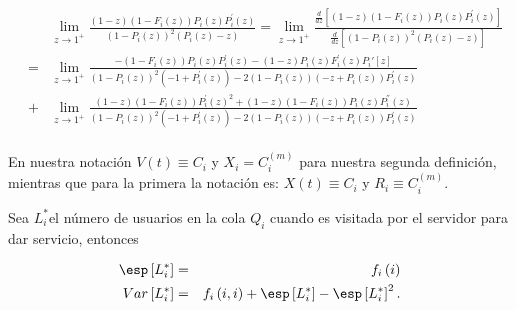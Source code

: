 \begin{eqnarray*}
&&\lim_{z\rightarrow1^{+}}\frac{\left(1-z\right)\left(1-F_{i}\left(z\right)\right)P_{i}\left(z\right)P_{i}^{'}\left(z\right)}{\left(1-P_{i}\left(z\right)\right)^{2}\left(P_{i}\left(z\right)-z\right)}=\lim_{z\rightarrow1^{+}}\frac{\frac{d}{dz}\left[\left(1-z\right)\left(1-F_{i}\left(z\right)\right)P_{i}\left(z\right)P_{i}^{'}\left(z\right)\right]}{\frac{d}{dz}\left[\left(1-P_{i}\left(z\right)\right)^{2}\left(P_{i}\left(z\right)-z\right)\right]}\\
&=&\lim_{z\rightarrow1^{+}}\frac{-\left(1-F_{i}\left(z\right)\right) P_{i}\left(z\right) P_{i}^{'}\left(z\right)-(1-z) P_{i}\left(z\right) F_{i}^{'}\left(z\right)P_i'[z]}{\left(1-P_{i}\left(z\right)\right)^2 \left(-1+P_{i}^{'}\left(z\right)\right)-2 \left(1-P_{i}\left(z\right)\right) \left(-z+P_{i}\left(z\right)\right) P_{i}^{'}\left(z\right)}\\
&+&\lim_{z\rightarrow1^{+}}\frac{(1-z) \left(1-F_{i}\left(z\right)\right) P_{i}^{'}\left(z\right)^2+(1-z) \left(1-F_{i}\left(z\right)\right) P_{i}\left(z\right) P_{i}^{''}\left(z\right)}{\left(1-P_{i}\left(z\right)\right)^2 \left(-1+P_{i}^{'}\left(z\right)\right)-2 \left(1-P_{i}\left(z\right)\right) \left(-z+P_{i}\left(z\right)\right) P_{i}^{'}\left(z\right)}\\
\end{eqnarray*}



En nuestra notaci\'on $V\left(t\right)\equiv C_{i}$ y $X_{i}=C_{i}^{(m)}$ para nuestra segunda definici\'on, mientras que para la primera la notaci\'on es: $X\left(t\right)\equiv C_{i}$ y $R_{i}\equiv C_{i}^{(m)}$.




\begin{Def}
Sea $L_{i}^{*}$el n\'umero de usuarios en la cola $Q_{i}$ cuando es visitada por el servidor para dar servicio, entonces

\begin{eqnarray}
\esp\left[L_{i}^{*}\right]&=&f_{i}\left(i\right)\\
Var\left[L_{i}^{*}\right]&=&f_{i}\left(i,i\right)+\esp\left[L_{i}^{*}\right]-\esp\left[L_{i}^{*}\right]^{2}.
\end{eqnarray}

\end{Def}

